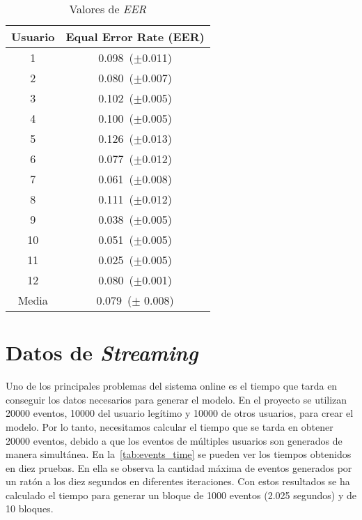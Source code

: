 


\begin{table}[htbp!]
    \centering
    \begin{tabular}{c c}
        \toprule
        Usuario & Equal Error Rate (EER) \\
        \midrule \midrule
        1 &  0.098~($\pm$0.011) \\
        2 &  0.080~($\pm$0.007) \\
        3 &  0.102~($\pm$0.005) \\
        4 &  0.100~($\pm$0.005) \\
        5 &  0.126~($\pm$0.013) \\
        6 &  0.077~($\pm$0.012) \\
        7 &  0.061~($\pm$0.008) \\
        8 &  0.111~($\pm$0.012) \\
        9 &  0.038~($\pm$0.005) \\
        10 &  0.051~($\pm$0.005)\\
        11 &  0.025~($\pm$0.005)\\
        12 &  0.080~($\pm$0.001)\\
        \midrule\midrule
        Media &  0.079~($\pm$ 0.008) \\
        \bottomrule
    \end{tabular}
    \caption{Valores de \textit{EER}}
    \label{tab:rf_eer_results}
\end{table}



\section{Datos de \textit{Streaming}}

Uno de los principales problemas del sistema online es el tiempo que tarda en conseguir los datos necesarios para generar el modelo. En el proyecto se utilizan 20000 eventos, 10000 del usuario legítimo y 10000 de otros usuarios, para crear el modelo. Por lo tanto, necesitamos calcular el tiempo que se tarda en obtener 20000 eventos, debido a que los eventos de múltiples usuarios son generados de manera simultánea. En la~\cref{tab:events_time} se pueden ver los tiempos obtenidos en diez pruebas. En ella se observa la cantidad máxima de eventos generados por un ratón a los diez segundos en diferentes iteraciones. Con estos resultados se ha calculado el tiempo para generar un bloque de 1000 eventos (2.025 segundos) y de 10 bloques.

